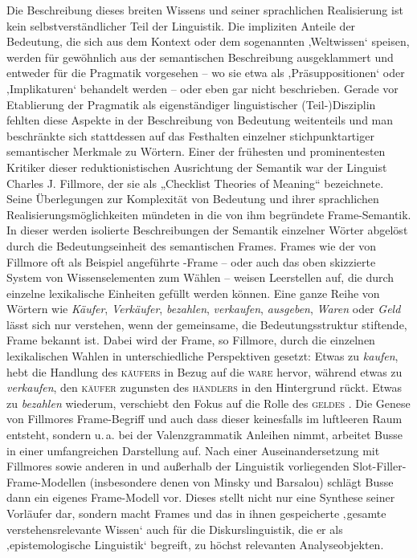 Die Beschreibung dieses breiten Wissens und seiner sprachlichen Realisierung ist kein selbstverständlicher Teil der Linguistik. Die impliziten Anteile der Bedeutung, die sich aus dem Kontext oder dem sogenannten ‚Weltwissen` speisen, werden für gewöhnlich aus der semantischen Beschreibung ausgeklammert und entweder für die Pragmatik vorgesehen -- wo sie etwa als ‚Präsuppositionen` oder ‚Implikaturen` behandelt werden -- oder eben gar nicht beschrieben. Gerade vor Etablierung der Pragmatik als eigenständiger linguistischer (Teil\mbox{-})Disziplin fehlten diese Aspekte in der Beschreibung von Bedeutung weitenteils und man beschränkte sich stattdessen auf das Festhalten einzelner stichpunktartiger semantischer Merkmale zu Wörtern. Einer der frühesten und prominentesten Kritiker dieser reduktionistischen Ausrichtung der Semantik war der Linguist Charles J. Fillmore, der sie als „Checklist Theories of Meaning`` \autocite*[123]{fillmoreAlternativeChecklistTheories1975} bezeichnete. Seine Überlegungen zur Komplexität von Bedeutung und ihrer sprachlichen Realisierungsmöglichkeiten mündeten in die von ihm begründete Frame-Semantik. In dieser werden isolierte Beschreibungen der Semantik einzelner Wörter abgelöst durch die Bedeutungseinheit des semantischen Frames. Frames wie der von Fillmore oft als Beispiel angeführte -Frame -- oder auch das oben skizzierte System von Wissenselementen zum Wählen -- weisen Leerstellen auf, die durch einzelne lexikalische Einheiten gefüllt werden können. Eine ganze Reihe von Wörtern wie \emph{Käufer}, \emph{Verkäufer}, \emph{bezahlen}, \emph{verkaufen}, \emph{ausgeben}, \emph{Waren} oder \emph{Geld} lässt sich nur verstehen, wenn der gemeinsame, die Bedeutungsstruktur stiftende, Frame bekannt ist. Dabei wird der Frame, so Fillmore, durch die einzelnen lexikalischen Wahlen in unterschiedliche Perspektiven gesetzt: Etwas zu \emph{kaufen}, hebt die Handlung des \textsc{käufers} in Bezug auf die \textsc{ware} hervor, während etwas zu \emph{verkaufen}, den \textsc{käufer} zugunsten des \textsc{händlers} in den Hintergrund rückt. Etwas zu \emph{bezahlen} wiederum, verschiebt den Fokus auf die Rolle des \textsc{geldes} \autocite[116-117]{fillmoreFrameSemantics1982}.
\largerpage
Die Genese von Fillmores Frame-Begriff und auch dass dieser keinesfalls im luftleeren Raum entsteht, sondern u.\,a. bei der Valenzgrammatik Anleihen nimmt, arbeitet Busse \autocite*{busseFrameSemantikKompendium2012} in einer umfangreichen Darstellung auf. Nach einer Auseinandersetzung mit Fillmores sowie anderen in und außerhalb der Linguistik vorliegenden Slot-Filler-Frame-Modellen (insbesondere denen von Minsky und Barsalou) schlägt Busse dann ein eigenes Frame-Modell vor. Dieses stellt nicht nur eine Synthese seiner Vorläufer dar, sondern macht Frames und das in ihnen gespeicherte ‚gesamte verstehensrelevante Wissen` auch für die Diskurslinguistik, die er als ‚epistemologische Linguistik` \autocite{busseDiskurslinguistikAlsEpistemologie2008} begreift, zu höchst relevanten Analyseobjekten.

